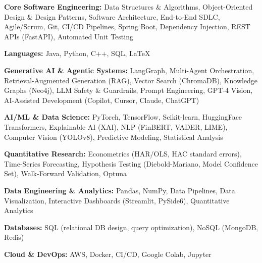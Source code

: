 \begin{resumeList}
    \item \textbf{Core Software Engineering:} Data Structures \& Algorithms, Object-Oriented Design \& Design Patterns, Software Architecture, End-to-End SDLC, Agile/Scrum, Git, CI/CD Pipelines, Spring Boot, Dependency Injection, REST APIs (FastAPI), Automated Unit Testing
    \item \textbf{Languages:} Java, Python, C++, SQL, LaTeX
    \item \textbf{Generative AI \& Agentic Systems:} LangGraph, Multi-Agent Orchestration, Retrieval-Augmented Generation (RAG), Vector Search (ChromaDB), Knowledge Graphs (Neo4j), LLM Safety \& Guardrails, Prompt Engineering, GPT-4 Vision, AI-Assisted Development (Copilot, Cursor, Claude, ChatGPT)
    \item \textbf{AI/ML \& Data Science:} PyTorch, TensorFlow, Scikit-learn, HuggingFace Transformers, Explainable AI (XAI), NLP (FinBERT, VADER, LIME), Computer Vision (YOLOv8), Predictive Modeling, Statistical Analysis
    \item \textbf{Quantitative Research:} Econometrics (HAR/OLS, HAC standard errors), Time-Series Forecasting, Hypothesis Testing (Diebold-Mariano, Model Confidence Set), Walk-Forward Validation, Optuna
    \item \textbf{Data Engineering \& Analytics:} Pandas, NumPy, Data Pipelines, Data Visualization, Interactive Dashboards (Streamlit, PySide6), Quantitative Analytics
    \item \textbf{Databases:} SQL (relational DB design, query optimization), NoSQL (MongoDB, Redis)
    \item \textbf{Cloud \& DevOps:} AWS, Docker, CI/CD, Google Colab, Jupyter
\end{resumeList}